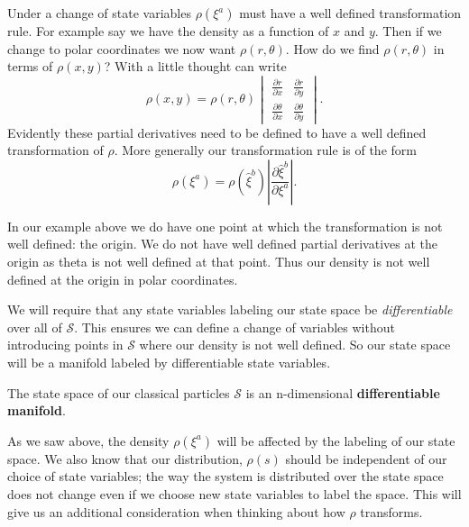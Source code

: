 \documentclass{article}
\begin{document}

	Under a change of state variables $\rho(\xi^a)$ must have a well defined transformation rule. For example say we have the density as a function of $x$ and $y$. Then if we change to polar coordinates we now want $\rho(r,\theta)$. How do we find $\rho(r,\theta)$ in terms of $\rho(x,y)$? With a little thought can write $$\rho(x,y) = \rho(r,\theta)\begin{vmatrix}
\frac{\partial r}{\partial x} & \frac{\partial r}{\partial y} \\
\frac{\partial \theta}{\partial x} & \frac{\partial \theta}{\partial y}
\end{vmatrix}.$$ Evidently these partial derivatives need to be defined to have a well defined transformation of $\rho$. More generally our transformation rule is of the form $$\rho(\xi^a) = \rho(\hat{\xi}^b)\left|\frac{\partial\hat{\xi}^b}{\partial\xi^a}\right|.$$

	In our example above we do have one point at which the transformation is not well defined: the origin. We do not have well defined partial derivatives at the origin as theta is not well defined at that point. Thus our density is not well defined at the origin in polar coordinates.
	
	We will require that any state variables labeling our state space be \textit{differentiable} over all of $\mathcal{S}$. This ensures we can define a change of variables without introducing points in $\mathcal{S}$ where our density is not well defined. So our state space will be a manifold labeled by differentiable state variables.

\begin{prop}
	The state space of our classical particles $\mathcal{S}$ is an n-dimensional \textbf{differentiable manifold}.
\end{prop}


	 As we saw above, the density $\rho(\xi^a)$ will be affected by the labeling of our state space. We also know that our distribution, $\rho(s)$ should be independent of our choice of state variables; the way the system is distributed over the state space does not change even if we choose new state variables to label the space.  This will give us an additional consideration when thinking about how $\rho$ transforms. 
	 
\end{document}
